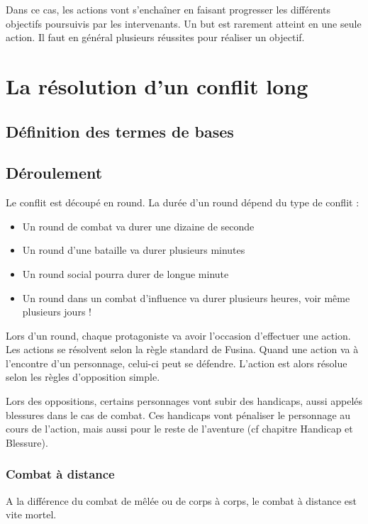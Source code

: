 Dans ce cas, les actions vont s’enchaîner en faisant progresser les différents objectifs poursuivis par les intervenants. Un but est rarement atteint en une seule action. Il faut en général plusieurs réussites pour réaliser un objectif. 

\section{La résolution d'un conflit long}

\subsection{Définition des termes de bases}

\subsection{Déroulement}

Le conflit est découpé en round. La durée d’un round dépend du type de conflit :

\begin{itemize}
\item Un round de combat va durer une dizaine de seconde
\item Un round d’une bataille va durer plusieurs minutes
\item Un round social pourra durer de longue minute
\item Un round dans un combat d’influence va durer plusieurs heures, voir même plusieurs jours !
\end{itemize}

Lors d’un round, chaque protagoniste va avoir l’occasion d’effectuer une action. Les actions se résolvent selon la règle standard de Fusina. Quand une action va à l’encontre d’un personnage, celui-ci peut se défendre. L’action est alors résolue selon les règles d’opposition simple.

Lors des oppositions, certains personnages vont subir des handicaps, aussi appelés blessures dans le cas de combat. Ces handicaps vont pénaliser le personnage au cours de l'action, mais aussi pour le reste de l'aventure (cf chapitre Handicap et Blessure). 

\subsubsection{Combat à distance}

A la différence du combat de mêlée ou de corps à corps, le combat à distance est vite mortel.

